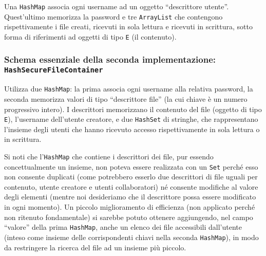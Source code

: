 \documentclass[a4paper,10pt]{article}
\begin{document}
 Una \texttt{HashMap} associa ogni username ad un oggetto ``descrittore utente''. Quest'ultimo memorizza la password e tre \texttt{ArrayList} che contengono rispettivamente i file creati, ricevuti in sola lettura e ricevuti in scrittura, sotto forma di riferimenti ad oggetti di tipo \texttt{E} (il contenuto).
 
 \vspace{-0.3cm}
 \subsubsection*{ Schema essenziale della seconda implementazione: \texttt{HashSecureFileContainer} }
 \vspace{-0.1cm}
 
 Utilizza due \texttt{HashMap}: la prima associa ogni username alla relativa password, la seconda memorizza valori di tipo ``descrittore file'' (la cui chiave è un numero progressivo intero). I descrittori memorizzano il contenuto del file (oggetto di tipo \texttt{E}), l'username dell'utente creatore, e due \texttt{HashSet} di stringhe, che rappresentano l'insieme degli utenti che hanno ricevuto accesso rispettivamente in sola lettura o in scrittura.
 
 \begin{small}
 Si noti che l'\texttt{HashMap} che contiene i descrittori dei file, pur essendo concettualmente un insieme, non poteva essere realizzata con un \texttt{Set} perché esso non consente duplicati (come potrebbero esserlo due descrittori di file uguali per contenuto, utente creatore e utenti collaboratori) né consente modifiche al valore degli elementi (mentre noi desideriamo che il descrittore possa essere modificato in ogni momento). Un piccolo miglioramento di efficienza (non applicato perché non ritenuto fondamentale) si sarebbe potuto ottenere aggiungendo, nel campo ``valore'' della prima \texttt{HashMap}, anche un elenco dei file accessibili dall'utente (inteso come insieme delle corrispondenti chiavi nella seconda \texttt{HashMap}), in modo da restringere la ricerca del file ad un insieme più piccolo.                                                                                                                                                                                                                                                                                                                                                                                                                                                                                                                                                                                                                                                                                                                                                                                                                                                       \end{small}

 
\end{document}
